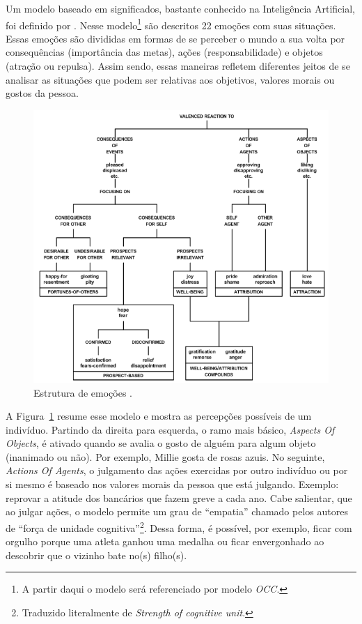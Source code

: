 Um modelo baseado em significados, bastante conhecido na Inteligência
Artificial, foi definido por \citet{ortony1988cse}. Nesse modelo\footnote{A
partir daqui o modelo será referenciado por modelo \emph{OCC}.} são descritos
22 emoções com suas situações. Essas emoções são divididas em formas de se
perceber o mundo a sua volta por consequências (importância das metas),
ações (responsabilidade) e objetos (atração ou repulsa). Assim sendo,
essas maneiras refletem diferentes jeitos de se
analisar as situações que podem ser relativas aos objetivos, valores morais ou
gostos da pessoa.

\begin{figure}[t]
  \centering
    \includegraphics[width=128mm]{figuras/occ.png}
  \caption[Estrutura de emoções.]{Estrutura de emoções \cite{ortony1988cse}.}
  \label{fig:occ_model}
\end{figure}

A Figura~\ref{fig:occ_model} resume esse modelo e mostra as
percepções possíveis de um indivíduo.  Partindo da direita para esquerda, o
ramo mais básico, \emph{Aspects Of Objects}, é ativado quando se avalia o
gosto de alguém para algum objeto (inanimado ou não). Por exemplo, Millie
gosta de rosas azuis. No seguinte, \emph{Actions Of Agents}, o julgamento das
ações exercidas por outro indivíduo ou por si mesmo é baseado nos
valores morais da pessoa que está julgando. Exemplo: reprovar a atitude dos
bancários que fazem greve a cada ano. Cabe salientar, que ao julgar ações, o
modelo permite um grau de ``empatia'' chamado pelos autores de ``força de unidade
cognitiva''\footnote{Traduzido literalmente de \emph{Strength of
cognitive unit}.}. Dessa forma, é possível, por exemplo, ficar com orgulho
porque uma atleta ganhou uma medalha ou ficar envergonhado ao descobrir que o
vizinho bate no(s) filho(s).

